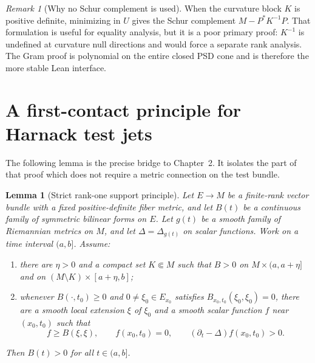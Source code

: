 \documentclass[10pt]{coll-l}
\newtheorem{lemma}[theorem]{Lemma}
\theoremstyle{definition}
\theoremstyle{remark}
\newtheorem{remark}[theorem]{Remark}
\numberwithin{section}{chapter}
\numberwithin{equation}{chapter}
\begin{document}
\begin{remark}[Why no Schur complement is used]
\label{rem:har-no-Schur}
When the curvature block $K$ is positive definite, minimizing in $U$ gives
the Schur complement $M-P^*K^{-1}P$.  That formulation is useful for
equality analysis, but it is a poor primary proof: $K^{-1}$ is undefined at
curvature null directions and would force a separate rank analysis.  The
Gram proof is polynomial on the entire closed PSD cone and is therefore the
more stable Lean interface.
\end{remark}

\section{A first-contact principle for Harnack test jets}
\label{sec:har-first-contact}

The following lemma is the precise bridge to Chapter~2.  It isolates the
part of that proof which does not require a metric connection on the test
bundle.

\begin{lemma}[Strict rank-one support principle]
\label{lem:har-strict-first-contact}
Let $E\to M$ be a finite-rank vector bundle with a fixed positive-definite
fiber metric, and let $B(t)$ be a continuous family of symmetric bilinear
forms on $E$.  Let $g(t)$ be a smooth family of Riemannian metrics on $M$,
and let $\Delta=\Delta_{g(t)}$ on scalar functions.  Work on a time interval
$(a,b]$.  Assume:
\begin{enumerate}
\item there are $\eta>0$ and a compact set $K\Subset M$ such that
      $B>0$ on $M\times(a,a+\eta]$ and on
      $(M\setminus K)\times[a+\eta,b]$;
\item whenever $B(\cdot,t_0)\geq0$ and
      $0\ne\xi_0\in E_{x_0}$ satisfies
      $B_{x_0,t_0}(\xi_0,\xi_0)=0$, there are a smooth local extension
      $\xi$ of $\xi_0$ and a smooth scalar function $f$ near $(x_0,t_0)$
      such that
      \begin{equation}
       f\geq B(\xi,\xi),\qquad
       f(x_0,t_0)=0,\qquad
       (\partial_t-\Delta)f(x_0,t_0)>0.                \label{eq:har-strict-support-hyp}
      \end{equation}
\end{enumerate}
Then $B(t)>0$ for all $t\in(a,b]$.
\end{lemma}
\end{document}
